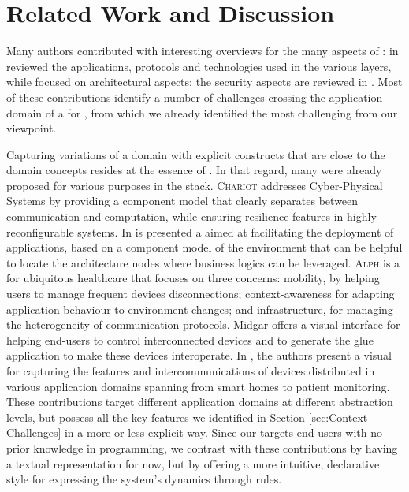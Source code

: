 \section{Related Work and Discussion}
\label{sec:RW}

Many authors contributed with interesting overviews for the many aspects of \IOT: in \cite{J:AlFuqaha-etAl:2014,xu-14a} reviewed the applications, protocols and technologies used in the various \IOT layers, while \cite{singh-14,gubbi-13} focused on architectural aspects; the security aspects are reviewed in \cite{tan-10,xu-14b}. Most of these contributions identify a number of challenges crossing the application domain of a \DSL for \IOT, from which we already identified the most challenging from our viewpoint.

Capturing variations of a domain with explicit constructs that are close to the domain concepts resides at the essence of \DSLS. In that regard, many \DSLS were already proposed for various purposes in the \IOT stack. \textsc{Chariot} \cite{Pradhan-etAl:2015} addresses Cyber-Physical Systems by providing a component model that clearly separates between communication and computation, while ensuring resilience features in highly reconfigurable systems. In \cite{Brandzaeg-Mohagheghi-Mosser:2012} is presented a \DSL aimed at facilitating the deployment of applications, based on a component model of the environment that can be helpful to locate the architecture nodes where business logics can be leveraged. \textsc{Alph} \cite{Munnelly-Clarke:2008} is a \DSL for ubiquitous healthcare that focuses on three concerns: mobility, by helping users to manage frequent devices disconnections; context-awareness for adapting application behaviour to environment changes; and infrastructure, for managing the heterogeneity of communication protocols. Midgar \cite{J:Garcia-etAl:2014} offers a visual interface for helping end-users to control interconnected devices and to generate the glue application to make these devices interoperate. In \cite{Salihbegovic-Eterovic-Kaljic-Ribic:2015}, the authors present a visual \DSL for capturing the features and intercommunications of devices distributed in various application domains spanning from smart homes to patient monitoring. These contributions target different application domains at different abstraction levels, but possess all the key features we identified in Section \ref{sec:Context-Challenges} in a more or less explicit way. Since our \DSL targets end-users with no prior knowledge in programming, we contrast with these contributions by having a textual representation for now, but by offering a more intuitive, declarative style for expressing the system's dynamics through rules.

